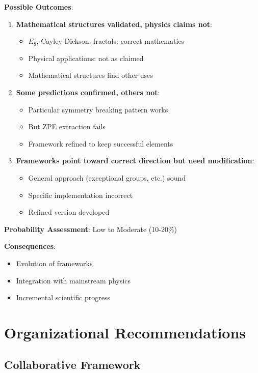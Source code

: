\textbf{Possible Outcomes}:
\begin{enumerate}
    \item \textbf{Mathematical structures validated, physics claims not}:
    \begin{itemize}
        \item $E_8$, Cayley-Dickson, fractals: correct mathematics
        \item Physical applications: not as claimed
        \item Mathematical structures find other uses
    \end{itemize}

    \item \textbf{Some predictions confirmed, others not}:
    \begin{itemize}
        \item Particular symmetry breaking pattern works
        \item But ZPE extraction fails
        \item Framework refined to keep successful elements
    \end{itemize}

    \item \textbf{Frameworks point toward correct direction but need modification}:
    \begin{itemize}
        \item General approach (exceptional groups, etc.) sound
        \item Specific implementation incorrect
        \item Refined version developed
    \end{itemize}
\end{enumerate}

\textbf{Probability Assessment}: Low to Moderate (10-20\%)

\textbf{Consequences}:
\begin{itemize}
    \item Evolution of frameworks
    \item Integration with mainstream physics
    \item Incremental scientific progress
\end{itemize}

\section{Organizational Recommendations}

\subsection{Collaborative Framework}

